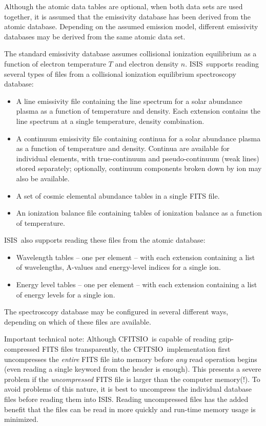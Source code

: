 \documentclass{book}
\newcommand{\isisx}{{\sc ISIS~}}
\newcommand{\isis}{{\sc ISIS}}
\newcommand{\cfitsio}{{\sc CFITSIO}}
\begin{document}
Although the atomic data tables are optional, when both data sets are used
together, it is assumed that the emissivity database has been derived from
the atomic database. Depending on the assumed emission model, different
emissivity databases may be derived from the same atomic data set.

The standard emissivity database assumes collisional ionization equilibrium
as a function of electron temperature $T$ and electron density $n$.
\isisx supports reading several types of files from a collisional ionization
equilibrium spectroscopy database:
\begin{itemize}
\item A line emissivity file containing the
  line spectrum for a solar abundance plasma as a function of temperature and
  density. Each extension contains the line spectrum at a single
temperature, density combination.
\item A continuum emissivity file containing continua for a solar abundance
  plasma as a function of temperature and density.
  Continua are available for individual elements, with true-continuum
  and pseudo-continuum (weak lines) stored separately;  optionally,
  continuum components broken down by ion may also be available.
\item A set of cosmic elemental abundance tables in a single FITS file.
\item An ionization balance file containing tables of ionization balance as a
      function of temperature.
\end{itemize}

\isisx also supports reading these files from the atomic database:
\begin{itemize}
\item Wavelength tables -- one per element -- with each extension containing
  a list of  wavelengths, A-values and energy-level indices for a single ion.
\item Energy level tables -- one per element -- with each extension
  containing a list of energy levels for a single ion.
\end{itemize}
The spectroscopy database may be configured in several different ways,
depending on which of these files are available.

Important technical note: Although \cfitsio\ is capable of reading
gzip-compressed FITS files transparently, the \cfitsio\ implementation first
uncompresses the {\it entire} FITS file into memory before {\it any} read
operation begins (even reading a single keyword from the header is enough).
This presents a severe problem if the {\it uncompressed} FITS file is larger
than the computer memory(!). To avoid problems of this nature, it is best to
uncompress the individual database files before reading them into
\isis. Reading uncompressed files has the added benefit that the files can
be read in more quickly and run-time memory usage is minimized.
\end{document}
